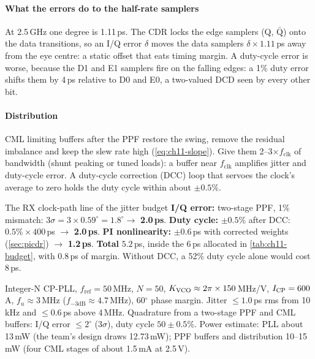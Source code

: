 \paragraph{What the errors do to the half-rate samplers}
At 2.5\,GHz one degree is 1.11\,ps. The CDR locks the edge samplers (Q, $\bar{\mathrm{Q}}$) onto the data transitions, so an I/Q error $\delta$ moves the data samplers $\delta\times1.11$\,ps away from the eye centre: a static offset that eats timing margin. A duty-cycle error is worse, because the D1 and E1 samplers fire on the falling edges: a 1\% duty error shifts them by 4\,ps relative to D0 and E0, a two-valued DCD seen by every other bit.

\paragraph{Distribution} CML limiting buffers after the PPF restore the swing, remove the residual imbalance and keep the slew rate high (\cref{eq:ch11-slope}). Give them 2--3$\times f_\mathrm{clk}$ of bandwidth (shunt peaking or tuned loads): a buffer near $f_\mathrm{clk}$ amplifies jitter and duty-cycle error. A duty-cycle correction (DCC) loop that servoes the clock's average to zero holds the duty cycle within about $\pm0.5\%$.

\begin{example}{The RX clock-path line of the jitter budget}\label{we:ch12-iq}
\textbf{I/Q error:} two-stage PPF, 1\% mismatch: $3\sigma = 3\times0.59^\circ = 1.8^\circ \to$ \textbf{2.0\,ps}.
\textbf{Duty cycle:} $\pm0.5\%$ after DCC: $0.5\% \times 400$\,ps $\to$ \textbf{2.0\,ps}.
\textbf{PI nonlinearity:} $\pm0.6$\,ps with corrected weights (\cref{sec:picdr}) $\to$ \textbf{1.2\,ps}.
\textbf{Total} $5.2$\,ps, inside the 6\,ps allocated in \cref{tab:ch11-budget}, with 0.8\,ps of margin. Without DCC, a 52\% duty cycle alone would cost 8\,ps.
\end{example}

\begin{specnote}
Integer-N CP-PLL, $f_\mathrm{ref} = 50$\,MHz, $N = 50$, $K_\mathrm{VCO} \approx 2\pi\times150$\,MHz/V, $I_\mathrm{CP} = 600$\,\textmu{}A, $f_u \approx 3$\,MHz ($f_{-3\mathrm{dB}} \approx 4.7$\,MHz), 60$^\circ$ phase margin. Jitter $\le 1.0$\,ps rms from 10\,kHz and $\le 0.6$\,ps above 4\,MHz. Quadrature from a two-stage PPF and CML buffers: I/Q error $\le 2^\circ$ ($3\sigma$), duty cycle $50 \pm 0.5\%$. Power estimate: PLL about 13\,mW (the team's design draws 12.73\,mW); PPF buffers and distribution 10--15\,mW (four CML stages of about 1.5\,mA at 2.5\,V).
\end{specnote}

